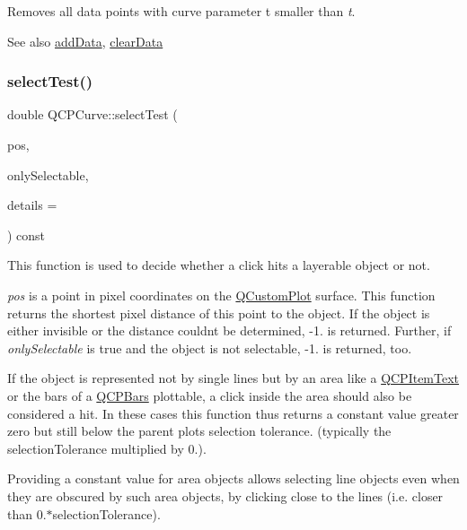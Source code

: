 Removes all data points with curve parameter t smaller than {\itshape t}. \begin{DoxySeeAlso}{See also}
\hyperlink{class_q_c_p_curve_a4e24023c3b9ac75440c7a260172c99af}{add\+Data}, \hyperlink{class_q_c_p_curve_ae0462c61dbfbac07db0736ec64110241}{clear\+Data} 
\end{DoxySeeAlso}
\hypertarget{class_q_c_p_curve_a87a9fb34a2a48dcae4c1245ada235e7d}{}\label{class_q_c_p_curve_a87a9fb34a2a48dcae4c1245ada235e7d} 
\subsubsection{\texorpdfstring{select\+Test()}{selectTest()}}
{\footnotesize\ttfamily double Q\+C\+P\+Curve\+::select\+Test (\begin{DoxyParamCaption}\item[{const Q\+PointF \&}]{pos,  }\item[{bool}]{only\+Selectable,  }\item[{Q\+Variant $\ast$}]{details = {} }\end{DoxyParamCaption}) const\hspace{0.3cm}{\ttfamily [virtual]}}

This function is used to decide whether a click hits a layerable object or not.

{\itshape pos} is a point in pixel coordinates on the \hyperlink{class_q_custom_plot}{Q\+Custom\+Plot} surface. This function returns the shortest pixel distance of this point to the object. If the object is either invisible or the distance couldn\textquotesingle{}t be determined, -\/1. is returned. Further, if {\itshape only\+Selectable} is true and the object is not selectable, -\/1. is returned, too.

If the object is represented not by single lines but by an area like a \hyperlink{class_q_c_p_item_text}{Q\+C\+P\+Item\+Text} or the bars of a \hyperlink{class_q_c_p_bars}{Q\+C\+P\+Bars} plottable, a click inside the area should also be considered a hit. In these cases this function thus returns a constant value greater zero but still below the parent plot\textquotesingle{}s selection tolerance. (typically the selection\+Tolerance multiplied by 0.).

Providing a constant value for area objects allows selecting line objects even when they are obscured by such area objects, by clicking close to the lines (i.\+e. closer than 0.$\ast$selection\+Tolerance).

